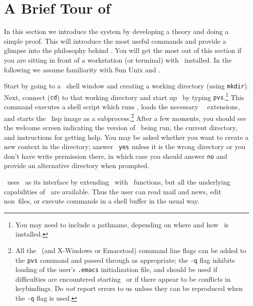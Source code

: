 \section{A Brief Tour of \pvs}
\label{system-tutorial}

In this section we introduce the system by developing a theory and
doing a simple proof.  This will introduce the most useful commands
and provide a glimpse into the philosophy behind \pvs.  You will get
the most out of this section if you are sitting in front of a
workstation (or terminal) with \pvs\ installed.  In the following we
assume familiarity with Sun Unix and \gnu.

Start by going to a \unix\ shell window and creating a working
directory (using {\tt mkdir}). Next, connect ({\tt cd}) to that
working directory and start up \pvs\ by typing {\tt pvs}.\footnote{You
may need to include a pathname, depending on where and how \pvs\ is
installed.} This command executes a shell script which runs \gnu,
loads the necessary \pvs\ \emacs\ extensions, and starts the \pvs\
lisp image as a subprocess.\footnote{All the \gnu\ (and X-Windows or
Emacstool) command line flags can be added to the {\tt pvs} command
and passed through as appropriate; the {\tt -q} flag inhibits loading
of the user's {\tt .emacs} initialization file, and should be used if
difficulties are encountered starting \pvs\ or if there appear to be
conflicts in keybindings.  Do {\em not\/} report errors to us unless
they can be reproduced when the {\tt -q} flag is used.} 
After a few moments, you should see the
welcome screen indicating the version of \pvs\ being run, the current
directory, and instructions for getting help.  You may be asked
whether you want to create a new context in the directory; answer {\tt
yes} unless it is the wrong directory or you don't have write
permission there, in which case you should answer {\tt no} and provide
an alternative directory when prompted.

\pvs\ uses \emacs\ as its interface by extending \emacs\ with \pvs\
functions, but all the underlying capabilities of \emacs\ are available.
Thus the user can read mail and news, edit non\pvs\ files, or execute
commands in a shell buffer in the usual way.

